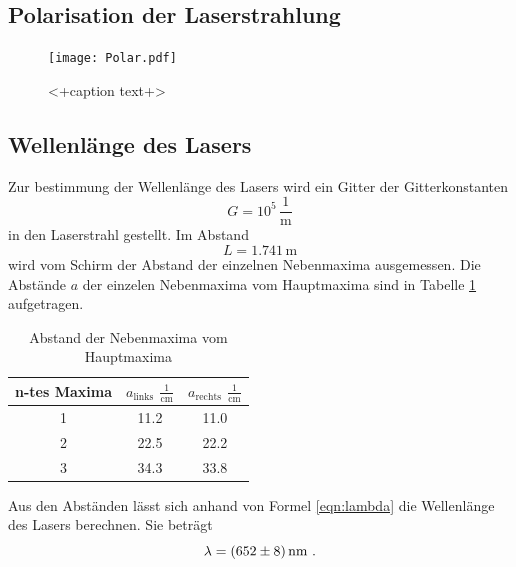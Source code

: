 \subsection{Polarisation der Laserstrahlung}

\begin{figure}
  \centering
  \texttt{[image: Polar.pdf]}
  \caption{<+caption text+>}
  \label{fig:}
\end{figure}
\subsection{Wellenlänge des Lasers}
Zur bestimmung der Wellenlänge des Lasers wird ein Gitter der Gitterkonstanten 
\begin{equation}
  G = 10^5 \, \frac{1}{\text{m}}
  \label{eqn:constg}
\end{equation}
in den Laserstrahl gestellt. Im Abstand 
\begin{equation}
  L = 1.741 \, \text{m}
  \label{eqn:K}
\end{equation}
wird vom Schirm der Abstand der einzelnen Nebenmaxima ausgemessen. Die Abstände $a$ der einzelen Nebenmaxima vom Hauptmaxima sind in Tabelle \ref{tab:max} aufgetragen.
\begin{table}
  \centering
  \begin{tabular}{c c c}
    \toprule
    n-tes Maxima & $a_\text{links}$ $\frac{1}{\text{cm}}$ & $a_\text{rechts}$ $\frac{1}{\text{cm}}$ \\
    \midrule
	1 & 11.2 & 11.0 \\
	2 & 22.5 & 22.2 \\
	3 & 34.3 & 33.8 \\
    \bottomrule
  \end{tabular}
  \caption{Abstand der Nebenmaxima vom Hauptmaxima}
  \label{tab:max}
\end{table}
Aus den Abständen lässt sich anhand von Formel \ref{eqn:lambda} die Wellenlänge des Lasers berechnen. Sie beträgt 
\begin{equation}
  \lambda = (\num{652 +- 8}) \, \text{nm} \ .
\end{equation}
